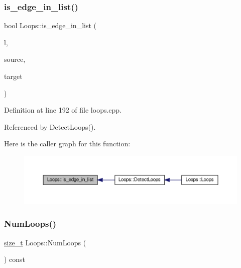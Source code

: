 \subsubsection{\texorpdfstring{is\+\_\+edge\+\_\+in\+\_\+list()}{is\_edge\_in\_list()}}
{\footnotesize\ttfamily bool Loops\+::is\+\_\+edge\+\_\+in\+\_\+list (\begin{DoxyParamCaption}\item[{\hyperlink{classCustomUnorderedSet}{Custom\+Unordered\+Set}$<$ \hyperlink{classLoops_a0128208bc6f5092dcd97a7f2e75b168c}{vertex\+\_\+pair} $>$ \&}]{l,  }\item[{\hyperlink{graph_8hpp_abefdcf0544e601805af44eca032cca14}{vertex}}]{source,  }\item[{\hyperlink{graph_8hpp_abefdcf0544e601805af44eca032cca14}{vertex}}]{target }\end{DoxyParamCaption})\hspace{0.3cm}{\ttfamily [private]}}



Definition at line 192 of file loops.\+cpp.



Referenced by Detect\+Loops().

Here is the caller graph for this function\+:
\nopagebreak
\begin{figure}[H]
\begin{center}
\leavevmode
\includegraphics[width=350pt]{d3/ded/classLoops_ac022f2714ff16a787ea9e609616e7f9d_icgraph}
\end{center}
\end{figure}
\mbox{\label{classLoops_a9cb155a94cf7363e6f15e770441fe20c}} 
\subsubsection{\texorpdfstring{Num\+Loops()}{NumLoops()}}
{\footnotesize\ttfamily \hyperlink{tutorial__fpt__2017_2intro_2sixth_2test_8c_a7c94ea6f8948649f8d181ae55911eeaf}{size\+\_\+t} Loops\+::\+Num\+Loops (\begin{DoxyParamCaption}{ }\end{DoxyParamCaption}) const}



